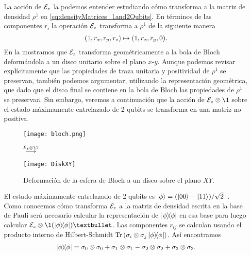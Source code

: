 La acción de $\mathcal{E}_z$ la podemos entender estudiando cómo transforma
a la matriz de densidad $\rho^1$ en
\eqref{eq:densityMatrices_1and2Qubits}.
En términos de las componentes $r_i$ la operación $\mathcal{E}_z$ 
transforma a $\rho^1$ de la siguiente manera
\begin{align}
\qty(1,r_x,r_y,r_z)\mapsto\qty(1,r_x,r_y,0).
\end{align}
En la  mostramos que $\mathcal{E}_z$ transforma 
geométricamente a la bola de Bloch deformándola a un disco
unitario sobre el plano $x$-$y$. Aunque podemos revisar explícitamente 
que las propiedades de traza unitaria y positividad de $\rho^1$ 
se preservan, también podemos argumentar, utilizando la representación
geométrica, que dado que el disco final se contiene en la bola de Bloch 
las propiedades de $\rho^1$ se preservan.
Sin embargo, veremos a continuación que la acción de $\E_z\ot \1$ 
sobre el estado máximamente entrelazado de 2 qubits 
se transforma en una matriz no positiva.

\begin{figure}%
\centering
\begin{minipage}{.4\textwidth}
\centering
\texttt{[image: bloch.png]}
\end{minipage}
$\stackrel{\E_{z}\otimes\1 \vspace{1cm}}{\longmapsto}$
\begin{minipage}{0.4\textwidth}
\centering
\texttt{[image: DiskXY]}
\end{minipage}
\caption{
Deformación de la esfera de Bloch a un disco sobre el plano $XY$.}
\label{fig:qtm-op-motivation}
\end{figure} %

El estado máximamente entrelazado de 2 qubits es
$\ket{\phi}=\qty(\ket{00}+\ket{11})/\sqrt{2}$~\cite{bengtsson_zyczkowski_2017}.
Como conocemos cómo transforma $\mathcal{E}_z$ a la matriz de densidad 
escrita en la base de Pauli será necesario calcular 
la representación de $\dyad{\phi}{\phi}$ en esa base para 
luego calcular $\E_z\ot \1(\dyad{\phi}{\phi})•$.
Las componentes $r_{ij}$ se calculan usando el producto interno
de Hilbert-Schmidt $\Tr\qty(\pauli{i}{j}\dyad{\phi}{\phi})$.
Así encontramos 
\begin{align}
\dyad{\phi}{\phi}=
\pauli{0}{0}+\pauli{1}{1}-\pauli{2}{2}+\pauli{3}{3}.
\end{align}

